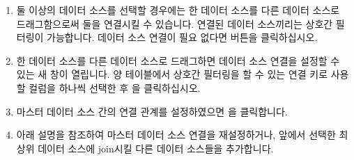 \documentclass[letterpaper,10pt,english]{sphinxmanual}
\begin{document}
\begin{enumerate}
\begin{quote}
\begin{itemize}
\end{itemize}
\end{quote}

\item {} 
둘 이상의 데이터 소스를 선택할 경우에는 한 데이터 소스를 다른 데이터 소스로 드래그함으로써 둘을 연결시킬 수 있습니다. 연결된 데이터 소스끼리는 상호간 필터링이 가능합니다. 데이터 소스 연결이 필요 없다면  버튼을 클릭하십시오.
\begin{quote}

\begin{figure}[H]
\centering

\noindent{}
\end{figure}
\end{quote}

\item {} 
한 데이터 소스를 다른 데이터 소스로 드래그하면 데이터 소스 연결을 설정할 수 있는 새 창이 열립니다. 양 테이블에서 상호간 필터링을 할 수 있는 연결 키로 사용할 컬럼을 하나씩 선택한 후 을 클릭하십시오.
\begin{quote}

\begin{figure}[H]
\centering

\noindent{}
\end{figure}
\end{quote}

\item {} 
마스터 데이터 소스 간의 연결 관계를 설정하였으면 을 클릭합니다.
\begin{quote}

\begin{figure}[H]
\centering

\noindent{}
\end{figure}
\end{quote}

\item {} 
아래 설명을 참조하여 마스터 데이터 소스 연결을 재설정하거나, 앞에서 선택한 최상위 데이터 소스에 join시킬 다른 데이터 소스들을 추가합니다.
\begin{quote}

\begin{figure}[H]
\centering

\noindent{}
\end{figure}


\end{quote}
\end{enumerate}
\end{document}

